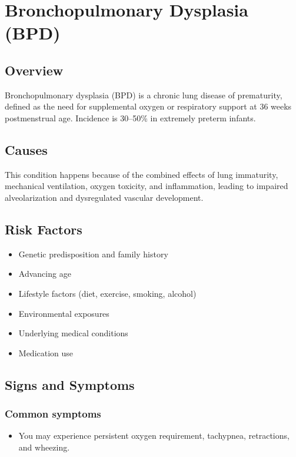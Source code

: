 \chapter{Bronchopulmonary Dysplasia (BPD)}
\label{sec:Bronchopulmonary Dysplasia}

\section{Overview}
Bronchopulmonary dysplasia (BPD) is a chronic lung disease of prematurity, defined as the need for supplemental oxygen or respiratory support at 36 weeks postmenstrual age. Incidence is 30--50\% in extremely preterm infants.
\section{Causes}
This condition happens because of the combined effects of lung immaturity, mechanical ventilation, oxygen toxicity, and inflammation, leading to impaired alveolarization and dysregulated vascular development.     
\section{Risk Factors}

\begin{itemize}[noitemsep]
  \item Genetic predisposition and family history
  \item Advancing age
  \item Lifestyle factors (diet, exercise, smoking, alcohol)
  \item Environmental exposures
  \item Underlying medical conditions
  \item Medication use
\end{itemize}
\section{Signs and Symptoms}

\subsection{Common symptoms}
\begin{itemize}[noitemsep]
  \item You may experience persistent oxygen requirement, tachypnea, retractions, and wheezing. 
  \end{itemize}

